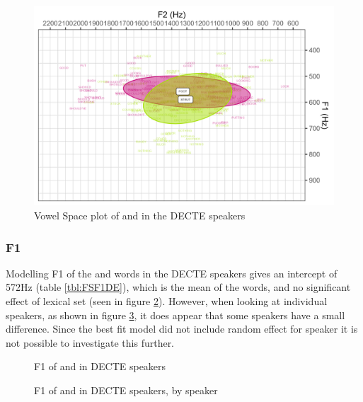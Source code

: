 \documentclass[../../../00.FullDoc/tex/ThesisSkeleton-draft2]{subfiles}
\begin{document}
\begin{figure}[h]
	\centering
	\includegraphics[width=\textwidth]{../figures/FS-DE-vplot.png}
	\caption{Vowel Space plot of \foot{} and \strutt{} in the DECTE speakers} \label{fig:FSvplotDE}
\end{figure}

\subsubsection{F1}
Modelling F1 of the \foot{} and \strutt{} words in the DECTE speakers gives an intercept of 572Hz (table \ref{tbl:FSF1DE}), which is the mean of the \foot{} words, and no significant effect of lexical set (seen in figure \ref{fig:FSF1DE}). However, when looking at individual speakers, as shown in figure \ref{fig:FSF1DE-id}, it does appear that some speakers have a small difference. Since the best fit model did not include random effect for speaker it is not possible to investigate this further.



\begin{figure}
	\centering
	
	\caption{F1 of \foot{} and \strutt{} in DECTE speakers} \label{fig:FSF1DE}
\end{figure}

\begin{figure}
	\centering
	
	\caption{F1 of \foot{} and \strutt{} in DECTE speakers, by speaker} \label{fig:FSF1DE-id}
\end{figure}
\end{document}
